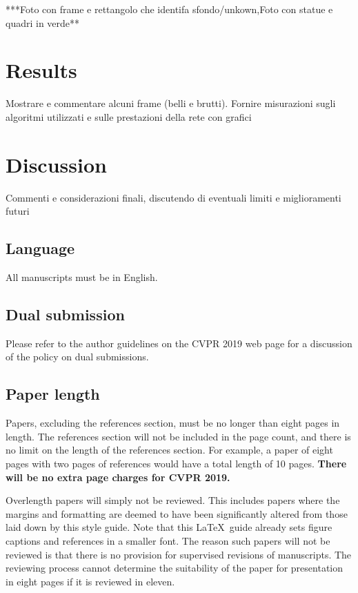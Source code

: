 \documentclass[10pt,twocolumn,letterpaper]{article}
\begin{document}
***Foto con frame e rettangolo che identifa sfondo/unkown,Foto con statue e quadri in verde**

\section{Results}

Mostrare e commentare alcuni frame (belli e brutti).
Fornire misurazioni sugli algoritmi utilizzati e sulle prestazioni della rete con grafici

\section{Discussion}

Commenti e considerazioni finali, discutendo di eventuali limiti e miglioramenti futuri




\subsection{Language}

All manuscripts must be in English.

\subsection{Dual submission}

Please refer to the author guidelines on the CVPR 2019 web page for a
discussion of the policy on dual submissions.

\subsection{Paper length}
Papers, excluding the references section,
must be no longer than eight pages in length. The references section
will not be included in the page count, and there is no limit on the
length of the references section. For example, a paper of eight pages
with two pages of references would have a total length of 10 pages.
{\bf There will be no extra page charges for CVPR 2019.}

Overlength papers will simply not be reviewed.  This includes papers
where the margins and formatting are deemed to have been significantly
altered from those laid down by this style guide.  Note that this
\LaTeX\ guide already sets figure captions and references in a smaller font.
The reason such papers will not be reviewed is that there is no provision for
supervised revisions of manuscripts.  The reviewing process cannot determine
the suitability of the paper for presentation in eight pages if it is
reviewed in eleven.  
\end{document}

